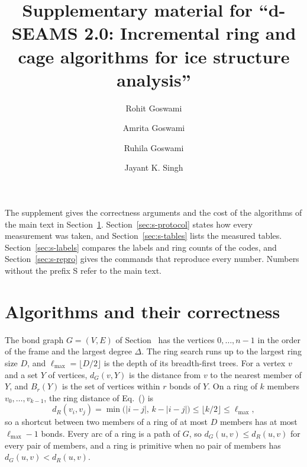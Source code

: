 \documentclass[preprint,12pt]{elsarticle}
\begin{document}
\begin{frontmatter}
\title{Supplementary material for ``d-SEAMS 2.0: Incremental ring and cage algorithms for ice structure analysis''}

\author[iitk]{Rohit Goswami}
\author[iitk]{Amrita Goswami}
\author[hi-life]{Ruhila Goswami}
\author[iitk]{Jayant K. Singh}
\address[iitk]{Department of Chemical Engineering, Indian Institute of Technology Kanpur, Kanpur 208016, Uttar Pradesh, India}
\address[hi-life]{Faculty of Life and Environmental Sciences, University of Iceland, Reykjavik, Iceland}
\end{frontmatter}

The supplement gives the correctness arguments and the cost of the algorithms of the main text in Section~\ref{sec:s-algorithms}.
Section~\ref{sec:s-protocol} states how every measurement was taken, and Section~\ref{sec:s-tables} lists the measured tables.
Section~\ref{sec:s-labels} compares the labels and ring counts of the codes, and Section~\ref{sec:s-repro} gives the commands that reproduce every number.
Numbers without the prefix S refer to the main text.

\section{Algorithms and their correctness}
\label{sec:s-algorithms}

The bond graph $G=(V,E)$ of Section~ has the vertices $0,\dots,n-1$ in the order of the frame and the largest degree $\Delta$.
The ring search runs up to the largest ring size $D$, and $\ell_{\max}=\lfloor D/2\rfloor$ is the depth of its breadth-first trees.
For a vertex $v$ and a set $Y$ of vertices, $d_G(v,Y)$ is the distance from $v$ to the nearest member of $Y$, and $B_r(Y)$ is the set of vertices within $r$ bonds of $Y$.
On a ring of $k$ members $v_0,\dots,v_{k-1}$, the ring distance of Eq.~() is
\begin{equation}
  d_R(v_i,v_j)=\min\bigl(|i-j|,\,k-|i-j|\bigr)\le\lfloor k/2\rfloor\le\ell_{\max},
  \label{eq:s-arc}
\end{equation}
so a shortcut between two members of a ring of at most $D$ members has at most $\ell_{\max}-1$ bonds.
Every arc of a ring is a path of $G$, so $d_G(u,v)\le d_R(u,v)$ for every pair of members, and a ring is primitive when no pair of members has $d_G(u,v)<d_R(u,v)$.
\end{document}
